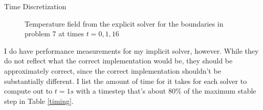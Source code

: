 \documentclass{article}
\begin{document}
\begin{section}{Time Discretization}
\begin{figure}[ht]
  \caption{Temperature field from the explicit solver for the boundaries in problem 7 at times $t = 0, 1, 16$}
  \label{exp_part7}
\end{figure}

I do have performance measurements for my implicit solver, however.
While they do not reflect what the correct implementation would be,
they should be approximately correct,
since the correct implementation shouldn't be substantially different.
I list the amount of time for it takes for each solver to compute out
to $t = 1 s$ with a timestep that's about $80\%$ of the maximum stable step in Table \ref{timing}.


\end{section}
\end{document}
